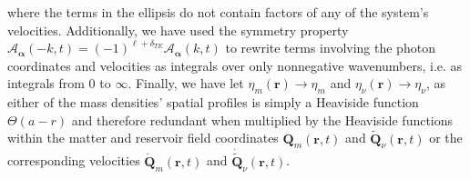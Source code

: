 \documentclass{article}
\begin{document}
where the terms in the ellipsis do not contain factors of any of the system's velocities. Additionally, we have used the symmetry property $\mathcal{A}_{\bm{\alpha}}(-k,t) = (-1)^{\ell + \delta_{TE}}\mathcal{A}_{\bm{\alpha}}(k,t)$ to rewrite terms involving the photon coordinates and velocities as integrals over only nonnegative wavenumbers, i.e. as integrals from 0 to $\infty$. Finally, we have let $\eta_m(\mathbf{r})\to\eta_m$ and $\eta_\nu(\mathbf{r})\to\eta_\nu$, as either of the mass densities' spatial profiles is simply a Heaviside function $\Theta(a - r)$ and therefore redundant when multiplied by the Heaviside functions within the matter and reservoir field coordinates $\mathbf{Q}_m(\mathbf{r},t)$ and $\tilde{\mathbf{Q}}_\nu(\mathbf{r},t)$ or the corresponding velocities $\dot{\mathbf{Q}}_m(\mathbf{r},t)$ and $\dot{\tilde{\mathbf{Q}}}_\nu(\mathbf{r},t)$.
\end{document}
